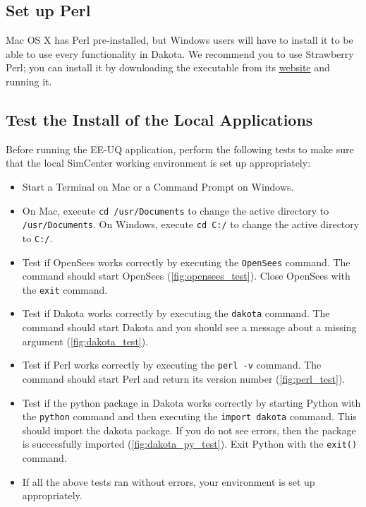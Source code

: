 \subsection{Set up Perl}

Mac OS X has Perl pre-installed, but Windows users will have to install it to be able to use every functionality in Dakota. We recommend you to use Strawberry Perl; you can install it by downloading the executable from its \href{http://strawberryperl.com}{website} and running it.

\subsection{Test the Install of the Local Applications}

Before running the EE-UQ application, perform the following tests to make sure that the local SimCenter working environment is set up appropriately:

\begin{itemize}
    \item Start a Terminal on Mac or a Command Prompt on Windows.
    \item On Mac, execute \texttt{cd /usr/Documents} to change the active directory to \texttt{/usr/Documents}. On Windows, execute \texttt{cd C:/} to change the active directory to \texttt{C:/}.
    \item Test if OpenSees works correctly by executing the \texttt{OpenSees} command. The command should start OpenSees (\autoref{fig:opensees_test}). Close OpenSees with the \texttt{exit} command.
    \item Test if Dakota works correctly by executing the \texttt{dakota} command. The command should start Dakota and you should see a message about a missing argument (\autoref{fig:dakota_test}).
    \item Test if Perl works correctly by executing the \texttt{perl -v} command. The command should start Perl and return its version number (\autoref{fig:perl_test}).
    \item Test if the python package in Dakota works correctly by starting Python with the \texttt{python} command and then executing the \texttt{import dakota} command. This should import the dakota package. If you do not see errors, then the package is successfully imported (\autoref{fig:dakota_py_test}). Exit Python with the \texttt{exit()} command.
    \item If all the above tests ran without errors, your environment is set up appropriately.
\end{itemize}

